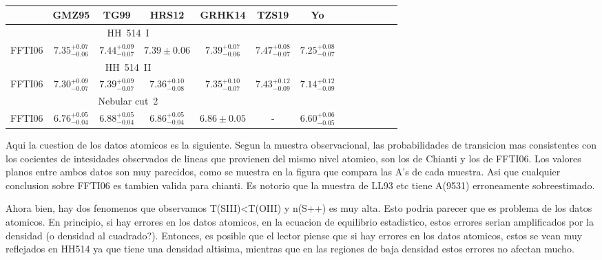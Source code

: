 \documentclass[fleqn,usenatbib]{mnras}
\begin{document}
\begin{table}
\centering
\caption{}
\label{tab:atomic_data_tempsiii}
\begin{adjustbox}{width=\textwidth}
\begin{tabular}{ccccccccccccc}
\hline
 & GMZ95 & TG99 & HRS12 & GRHK14 & TZS19 & Yo\\
\hline
\multicolumn{5}{c}{HH~514~I} \\
 

FFTI06 & $7.35^{+0.07} _{-0.06}$ & $7.44^{+0.09} _{-0.07}$&$7.39 \pm 0.06 $&$7.39^{+0.07} _{-0.06}$&$7.47^{+0.08} _{-0.07}$&$7.25^{+0.08} _{-0.07}$\\


\multicolumn{5}{c}{HH~514~II} \\



FFTI06 & $7.30^{+0.09} _{-0.07}$ & $7.39^{+0.09} _{-0.07}$& $7.36^{+0.10} _{-0.08}$&$7.35^{+0.10} _{-0.07}$& $7.43^{+0.12} _{-0.09}$ & $7.14^{+0.12} _{-0.09}$\\


\multicolumn{5}{c}{Nebular cut~2} \\


FFTI06 &$6.76^{+0.05} _{-0.04}$ &$6.88^{+0.05} _{-0.04}$ &$6.86^{+0.05} _{-0.04}$ &$6.86 \pm 0.05 $ &-&$6.60^{+0.06} _{-0.05}$ \\


\hline
\end{tabular}
\end{adjustbox}
\end{table}



Aqui la cuestion de los datos atomicos es la siguiente. Segun la muestra observacional, las probabilidades de transicion mas consistentes con los cocientes de intesidades observados de lineas que provienen del mismo nivel atomico, son los de Chianti y los de FFTI06. Los valores planos entre ambos datos son muy parecidos, como se muestra en la figura que compara las A's de cada muestra. Asi que cualquier conclusion sobre FFTI06 es tambien valida para chianti. Es notorio que la muestra de LL93 etc tiene A(9531) erroneamente sobreestimado.


Ahora bien, hay dos fenomenos que observamos T(SIII)<T(OIII) y n(S++) es muy alta. Esto podria parecer que es problema de los datos atomicos. En principio, si hay errores en los datos atomicos, en la ecuacion de equilibrio estadistico, estos errores serian amplificados por la densidad (o densidad al cuadrado?).  Entonces, es posible que el lector piense que si hay errores en los datos atomicos, estos se vean muy reflejados en HH514 ya que tiene una densidad altisima, mientras que en las regiones de baja densidad estos errores no afectan mucho. 
\end{document}
